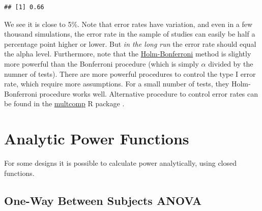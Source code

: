 \documentclass[]{book}
\begin{document}
\begin{verbatim}
## [1] 0.66
\end{verbatim}

We see it is close to 5\%. Note that error rates have variation, and even in a few thousand simulations, the error rate in the sample of studies can easily be half a percentage point higher or lower. But \emph{in the long run} the error rate should equal the alpha level. Furthermore, note that the \href{https://en.wikipedia.org/wiki/Holm\%E2\%80\%93Bonferroni_method}{Holm-Bonferroni} method is slightly more powerful than the Bonferroni procedure (which is simply \(\alpha\) divided by the numner of tests). There are more powerful procedures to control the type I error rate, which require more assumptions. For a small number of tests, they Holm-Bonferroni procedure works well. Alternative procedure to control error rates can be found in the \href{https://cran.r-project.org/web/packages/multcomp/index.html}{multcomp} R package \citep{R-multcomp}.

\hypertarget{analytic-power-functions}{%
\chapter{Analytic Power Functions}\label{analytic-power-functions}}

For some designs it is possible to calculate power analytically, using closed functions.

\hypertarget{one-way-between-subjects-anova}{%
\section{One-Way Between Subjects ANOVA}\label{one-way-between-subjects-anova}}
\end{document}
